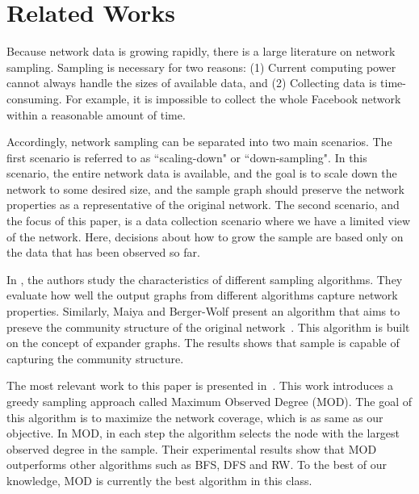 
\section{Related Works}
Because network data is growing rapidly, there is a large literature on network sampling.  Sampling is necessary for two reasons: (1) Current computing power cannot always handle the sizes of available data, and (2) Collecting data is time-consuming.  For example, it is impossible to collect the whole Facebook network within a reasonable amount of time. %

Accordingly, network sampling can be separated into two main scenarios.  The first scenario is referred to as ``scaling-down" or ``down-sampling". In this scenario, the entire network data is available, and the goal is to scale down the network to some desired size, and the sample graph should preserve the network properties as a representative of the original network.  The second scenario, and the focus of this paper, is a data collection scenario where we have a limited view of the network.  Here, decisions about how to grow the sample are based only on the data that has been observed so far.

In \cite{leskovec2006sampling}, the authors study the characteristics of different sampling algorithms. They evaluate how well the output graphs from different algorithms capture network properties. Similarly, Maiya and Berger-Wolf present an algorithm that aims to preseve the community structure of the original network~\cite{maiya2010sampling}. This algorithm is built on the concept of expander graphs. The results shows that sample is capable of capturing the community structure.

The most relevant work to this paper is presented in~\cite{avrachenkov2014pay}.  This work introduces a greedy sampling approach called Maximum Observed Degree (MOD). The goal of this algorithm is to maximize the network coverage, which is as same as our objective. In MOD, in each step the algorithm selects the node with the largest observed degree in the sample. Their experimental results show that MOD outperforms other algorithms such as BFS, DFS and RW. To the best of our knowledge, MOD is currently the best algorithm in this class.

